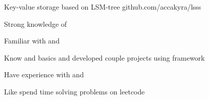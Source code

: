 \documentclass[]{cv-style}
\begin{document}
    \hspace*{0.7cm} {Key-value storage based on LSM-tree github.com/accakyra/lsss}

    \vspace{1cm}

    \hspace*{0.7cm} Strong knowledge of {}
    {\par}
    \hspace*{0.7cm} Familiar with {} and {}
    {\par}
    \hspace*{0.7cm} Know {} and {} basics
    and developed couple projects using { framework}
    {\par}
    \hspace*{0.7cm} Have experience with {} and {}
    {\par}
    \hspace*{0.7cm} Like spend time solving problems on leetcode
\end{document}
